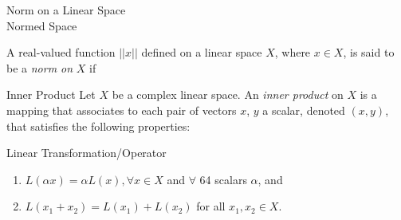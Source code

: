 \documentclass[avery5371,frame]{flashcards}
\begin{document}
\begin{flashcard}[Definição]{Norm on a Linear Space \\ Normed Space}

A real-valued function $||x||$ defined on a linear space $X$, where $x \in X$, is said to be a \emph{norm on} $X$ if

\end{flashcard}

\begin{flashcard}[Definição]{Inner Product}
    Let $X$ be a complex linear space. An \emph{inner product} on $X$ is a mapping that associates to each pair of vectors $x$, $y$ a scalar, denoted $(x,y)$, that satisfies the following properties:
\end{flashcard}


\begin{flashcard}[Definição]{Linear Transformation/Operator}

    \begin{enumerate}
    \item $L(\alpha x) = \alpha L(x), \forall x\in X$ and $\forall$ 64 scalars $\alpha$, and
    \item $L(x_1 + x_2) = L(x_1) + L(x_2)$ for all $x_1,x_2 \in X$.
    \end{enumerate}
\end{flashcard}
\end{document}
